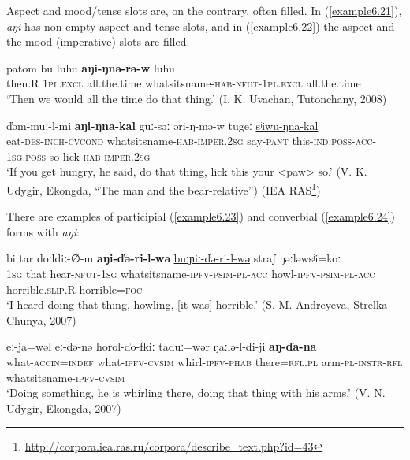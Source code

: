 \documentclass[output=paper,colorlinks,citecolor=brown]{langscibook}
\begin{document}
Aspect and mood/tense slots are, on the contrary, often filled. In (\ref{example6.21}), \textit{aŋi} has non-empty aspect and tense slots, and in (\ref{example6.22}) the aspect and the mood (imperative) slots are filled.

\ea
    \label{example6.21}
    \gll patom	bu	luhu	\textbf{aŋi-ŋnə-rə-w}	luhu\\
    then.R	1\textsc{pl.excl}	all.the.time	whatsitsname-\textsc{hab}-\textsc{nfut}-1\textsc{pl.excl}	all.the.time\\
    \glt `Then we would all the time do that thing.' (I. K. Uvachan, Tutonchany, 2008)\\
    \z

\ea
    \label{example6.22}
    \gll ďəm-muː-l-mi	\textbf{aŋi-ŋna-kal}	guː-səː	əri-ŋ-mə-w  tugeː	\uline{sʲiwu-ŋna-kal}\\
    eat-\textsc{des}-\textsc{inch}-\textsc{cvcond}	whatsitsname-\textsc{hab}-\textsc{imper}.2\textsc{sg}	say-\textsc{pant}	this-\textsc{ind.poss}-\textsc{acc}-1\textsc{sg.poss}    so	lick-\textsc{hab}-\textsc{imper}.2\textsc{sg}\\
    \glt `If you get hungry, he said, do that thing, lick this your <paw> so.' (V. K. Udygir, Ekongda, “The man and the bear-relative”) (IEA RAS\footnote{  \url{http://corpora.iea.ras.ru/corpora/describe_text.php?id=43}})\\
    \z


There are examples of participial (\ref{example6.23}) and converbial (\ref{example6.24}) forms with \textit{aŋi}:

\ea
    \label{example6.23}
    \gll bi	tar	doːldiː-∅-m	\textbf{aŋi-ďə-ri-l-wə}  \uline{buːɲiː-ďə-ri-l-wə}	straʃ	ŋəːləwsʲi=koː\\
    1\textsc{sg}	that	hear-\textsc{nfut}-1\textsc{sg}	whatsitsname-\textsc{ipfv}-\textsc{psim}-\textsc{pl}-\textsc{acc} howl-\textsc{ipfv}-\textsc{psim}-\textsc{pl}-\textsc{acc}	horrible.\textsc{slip}.R	horrible=\textsc{foc}\\
    \glt `I heard doing that thing, howling, [it was] horrible.' (S. M. Andreyeva, Strelka-Chunya, 2007)\\
    \z

\ea
    \label{example6.24}
    \gll eː-ja=wəl	eː-ďə-nə	horol-ďo-fkiː	taduː=wər   ŋaːlə-l-ďi-ji	\textbf{aŋ-ďa-na}\\
    what-\textsc{accin}=\textsc{indef}	what-\textsc{ipfv}-\textsc{cvsim}	whirl-\textsc{ipfv}-\textsc{phab}	there=\textsc{rfl}.\textsc{pl} arm-\textsc{pl}-\textsc{instr}-\textsc{rfl}	whatsitsname-\textsc{ipfv}-\textsc{cvsim}\\
    \glt `Doing something, he is whirling there, doing that thing with his arms.' (V. N. Udygir, Ekongda, 2007)\\
    \z
\end{document}

